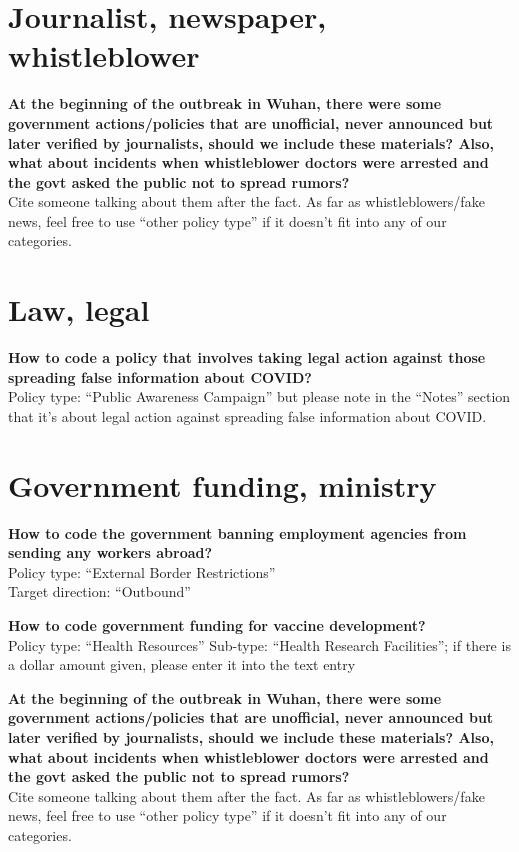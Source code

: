 \documentclass[
]{book}
\begin{document}
\hypertarget{journalist-newspaper-whistleblower}{%
\section{Journalist, newspaper, whistleblower}\label{journalist-newspaper-whistleblower}}

\textbf{At the beginning of the outbreak in Wuhan, there were some government actions/policies that are unofficial, never announced but later verified by journalists, should we include these materials? Also, what about incidents when whistleblower doctors were arrested and the govt asked the public not to spread rumors?}\\
Cite someone talking about them after the fact. As far as whistleblowers/fake news, feel free to use ``other policy type'' if it doesn't fit into any of our categories.

\hypertarget{law-legal}{%
\section{Law, legal}\label{law-legal}}

\textbf{How to code a policy that involves taking legal action against those spreading false information about COVID?}\\
Policy type: ``Public Awareness Campaign'' but please note in the ``Notes'' section that it's about legal action against spreading false information about COVID.

\hypertarget{government-funding-ministry}{%
\section{Government funding, ministry}\label{government-funding-ministry}}

\textbf{How to code the government banning employment agencies from sending any workers abroad?}\\
Policy type: ``External Border Restrictions''\\
Target direction: ``Outbound''

\textbf{How to code government funding for vaccine development?}\\
Policy type: ``Health Resources''
Sub-type: ``Health Research Facilities''; if there is a dollar amount given, please enter it into the text entry

\textbf{At the beginning of the outbreak in Wuhan, there were some government actions/policies that are unofficial, never announced but later verified by journalists, should we include these materials? Also, what about incidents when whistleblower doctors were arrested and the govt asked the public not to spread rumors?}\\
Cite someone talking about them after the fact. As far as whistleblowers/fake news, feel free to use ``other policy type'' if it doesn't fit into any of our categories.
\end{document}

